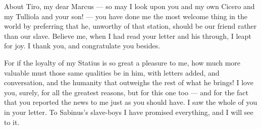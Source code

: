 

 About Tiro, my dear Marcus --- so may I look upon you and my own Cicero and my Tulliola and your son! --- you have done me the most welcome thing in the world by preferring that he, unworthy of that station, should be our friend rather than our slave. Believe me, when I had read your letter and his through, I leapt for joy. I thank you, and congratulate you besides.

 For if the loyalty of my Statius is so great a pleasure to me, how much more valuable must those same qualities be in him, with letters added, and conversation, and the humanity that outweighs the rest of what he brings! I love you, surely, for all the greatest reasons, but for this one too --- and for the fact that you reported the news to me just as you should have. I saw the whole of you in your letter. To Sabinus's slave-boys I have promised everything, and I will see to it.
